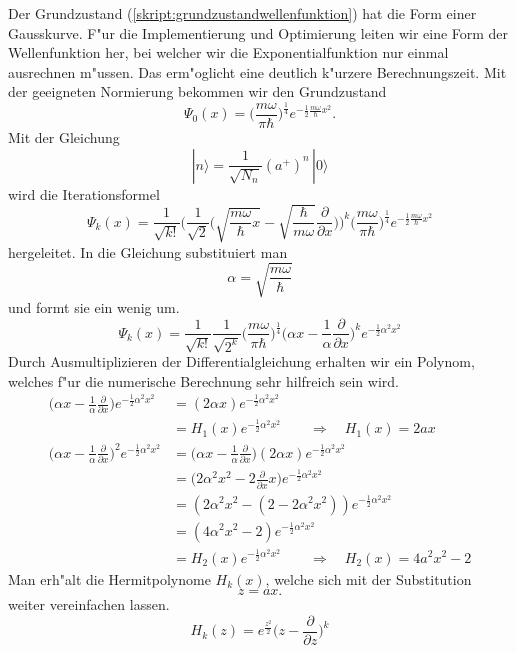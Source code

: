 \begin{refsection}
Der Grundzustand (\ref{skript:grundzustandwellenfunktion})
hat die Form einer Gausskurve.
F"ur die Implementierung und Optimierung leiten wir eine Form der Wellenfunktion her,
bei welcher wir die Exponentialfunktion nur einmal ausrechnen m"ussen.
Das erm"oglicht eine deutlich k"urzere Berechnungszeit.
Mit der geeigneten Normierung bekommen wir den Grundzustand
\[
\Psi_0(x)
=
\biggl(\frac{m\omega}{\pi\hbar}\biggr)^\frac14
e^{-\frac12\frac{m\omega}{\hbar}x^2}.
\]
Mit der Gleichung
\[
|n\rangle
=
\frac{1}{\sqrt{N_n}}(a^+)^n\,|0\rangle
\]
wird die Iterationsformel
\begin{equation}
\Psi_k(x)
=
\frac1{\sqrt{k!}}\biggl(\frac1{\sqrt{2}}
\biggl(\sqrt{\frac{m\omega}{\hbar}x}-
\sqrt{\frac{\hbar}{m\omega}}\frac{\partial}{\partial x}\biggr)\biggr)^k
\biggl(\frac{m\omega}{\pi\hbar}\biggr)^\frac14
e^{-\frac12\frac{m\omega}{\hbar}x^2}
\label{skript:iterationsformel}
\end{equation}
hergeleitet.
In die Gleichung substituiert man
\[
\alpha=\sqrt{\frac{m\omega}\hbar}
\]
und formt sie ein wenig um.
\[
\Psi_k(x)
=
\frac1{\sqrt{k!}}\frac1{\sqrt{2^k}}
\biggl(\frac{m\omega}{\pi\hbar}\biggr)^\frac14
\biggl(\alpha x-\frac1{\alpha}\frac{\partial}{\partial x}\biggr)^k
e^{-\frac12\alpha^2x^2}
\]
Durch Ausmultiplizieren der Differentialgleichung erhalten wir ein Polynom,
welches f"ur die numerische Berechnung sehr hilfreich sein wird.
\begin{align*}
\biggl(\alpha x-\frac1{\alpha}\frac{\partial}{\partial x}\biggr)
e^{-\frac12\alpha^2x^2}
&=
(2\alpha x)e^{-\frac12\alpha^2x^2}
\\
&=
H_1(x)e^{-\frac12\alpha^2x^2}
\quad
\quad
\Rightarrow
\quad
H_1(x)
=
2ax
\\
\biggl(\alpha x-\frac1{\alpha}\frac{\partial}{\partial x}\biggr)^2
e^{-\frac12\alpha^2x^2}
&=
\biggl(\alpha x-\frac1{\alpha}\frac{\partial}{\partial x}\biggr)
(2\alpha x)e^{-\frac12\alpha^2x^2}
\\
&=
\biggl(2\alpha^2 x^2-2\frac{\partial}{\partial x}x\biggr)
e^{-\frac12\alpha^2x^2}
\\
&=
(2\alpha^2x^2-(2-2\alpha^2x^2))e^{-\frac12\alpha^2x^2}
\\
&=
(4\alpha^2x^2-2)e^{-\frac12\alpha^2x^2}
\\
&=
H_2(x)e^{-\frac12\alpha^2x^2}
\quad
\quad
\Rightarrow
\quad
H_2(x)
=
4a^2x^2-2
\end{align*}
Man erh"alt die Hermitpolynome $H_k(x)$,
welche sich mit der Substitution
\[
z
=
ax.
\]
weiter vereinfachen lassen.
\[
H_k(z)
=
e^{\frac{z^2}2}\biggl(z-\frac{\partial}{\partial z}\biggr)^k
\]
\end{refsection}
